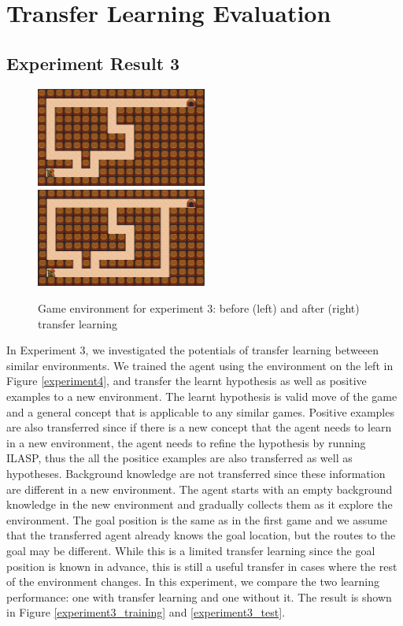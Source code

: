 \newpage
\section{Transfer Learning Evaluation}
\label{sec:transfer_learning_evaluation}
\subsection{Experiment Result 3}

\begin{figure}[!htb]
\centerline{
\includegraphics[width=0.5\textwidth]{./figures/experiment4_before}
\includegraphics[width=0.5\textwidth]{./figures/experiment4_after}
}
\caption{Game environment for experiment 3: before (left) and after (right) transfer learning}
\label{experiment3}
\end{figure}

In Experiment 3, we investigated the potentials of transfer learning betweeen similar environments.
We trained the agent using the environment on the left in Figure \ref{experiment4}, and transfer the learnt hypothesis as well as positive examples to a new environment.
The learnt hypothesis is valid move of the game and a general concept that is applicable to any similar games. Positive examples are also transferred since
if there is a new concept that the agent needs to learn in a new environment, the agent needs to refine the hypothesis by running ILASP, thus the all the positice examples
are also transferred as well as hypotheses. Background knowledge are not transferred since these information are different in a new environment.
The agent starts with an empty background knowledge in the new environment and gradually collects them
as it explore the environment. The goal position is the same as in the first game and we assume that the transferred agent already knows the goal location, but the routes to the goal may be different.
While this is a limited transfer learning since the goal position is known in advance, this is still a useful transfer in cases where the rest of the environment changes.
In this experiment, we compare the two learning performance: one with transfer learning and one without it.
The result is shown in Figure \ref{experiment3_training} and \ref{experiment3_test}.

